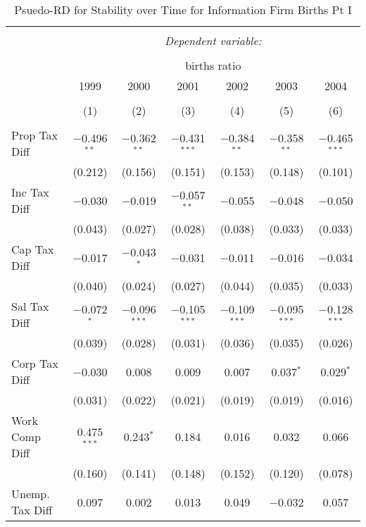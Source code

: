 
\begin{table}[!htbp] \centering 
  \caption{Psuedo-RD for Stability over Time for  Information Firm Births Pt I} 
  \label{51year} 
\small 
\begin{tabular}{@{\extracolsep{5pt}}lcccccc} 
\\[-1.8ex]\hline 
\hline \\[-1.8ex] 
 & \multicolumn{6}{c}{\textit{Dependent variable:}} \\ 
\cline{2-7} 
\\[-1.8ex] & \multicolumn{6}{c}{births ratio} \\ 
 & 1999 & 2000 & 2001 & 2002 & 2003 & 2004 \\ 
\\[-1.8ex] & (1) & (2) & (3) & (4) & (5) & (6)\\ 
\hline \\[-1.8ex] 
 Prop Tax Diff & $-$0.496$^{**}$ & $-$0.362$^{**}$ & $-$0.431$^{***}$ & $-$0.384$^{**}$ & $-$0.358$^{**}$ & $-$0.465$^{***}$ \\ 
  & (0.212) & (0.156) & (0.151) & (0.153) & (0.148) & (0.101) \\ 
  Inc Tax Diff & $-$0.030 & $-$0.019 & $-$0.057$^{**}$ & $-$0.055 & $-$0.048 & $-$0.050 \\ 
  & (0.043) & (0.027) & (0.028) & (0.038) & (0.033) & (0.033) \\ 
  Cap Tax Diff & $-$0.017 & $-$0.043$^{*}$ & $-$0.031 & $-$0.011 & $-$0.016 & $-$0.034 \\ 
  & (0.040) & (0.024) & (0.027) & (0.044) & (0.035) & (0.033) \\ 
  Sal Tax Diff & $-$0.072$^{*}$ & $-$0.096$^{***}$ & $-$0.105$^{***}$ & $-$0.109$^{***}$ & $-$0.095$^{***}$ & $-$0.128$^{***}$ \\ 
  & (0.039) & (0.028) & (0.031) & (0.036) & (0.035) & (0.026) \\ 
  Corp Tax Diff & $-$0.030 & 0.008 & 0.009 & 0.007 & 0.037$^{*}$ & 0.029$^{*}$ \\ 
  & (0.031) & (0.022) & (0.021) & (0.019) & (0.019) & (0.016) \\ 
  Work Comp Diff & 0.475$^{***}$ & 0.243$^{*}$ & 0.184 & 0.016 & 0.032 & 0.066 \\ 
  & (0.160) & (0.141) & (0.148) & (0.152) & (0.120) & (0.078) \\ 
  Unemp. Tax Diff & 0.097 & 0.002 & 0.013 & 0.049 & $-$0.032 & 0.057 \\ 

\end{tabular}
\end{table}

